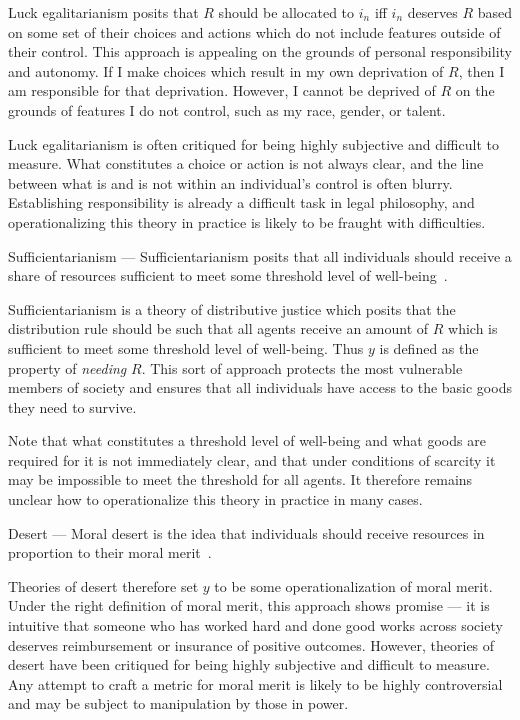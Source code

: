 Luck egalitarianism posits that $R$ should be allocated to $i_n$ iff $i_n$
deserves $R$ based on some set of their choices and actions which do not include
features outside of their control. This approach is appealing on the grounds of
personal responsibility and autonomy. If I make choices which result in my own
deprivation of $R$, then I am responsible for that deprivation. However, I
cannot be deprived of $R$ on the grounds of features I do not control, such as
my race, gender, or talent.

Luck egalitarianism is often critiqued for being highly subjective and difficult
to measure. What constitutes a choice or action is not always clear, and the
line between what is and is not within an individual's control is often blurry.
Establishing responsibility is already a difficult task in legal philosophy, and
operationalizing this theory in practice is likely to be fraught with
difficulties.

\begin{definition}
    Sufficientarianism — Sufficientarianism posits that all individuals should
    receive a share of resources sufficient to meet some threshold level of
    well-being~\cite{Sen_1979}.
\end{definition}

Sufficientarianism is a theory of distributive justice which posits that the
distribution rule should be such that all agents receive an amount of $R$ which
is sufficient to meet some threshold level of well-being. Thus $y$ is defined as
the property of \textit{needing} $R$. This sort of approach protects the most
vulnerable members of society and ensures that all individuals have access to
the basic goods they need to survive.

Note that what constitutes a threshold level of well-being and what goods are
required for it is not immediately clear, and that under conditions of scarcity
it may be impossible to meet the threshold for all agents. It therefore remains
unclear how to operationalize this theory in practice in many cases.

\begin{definition}
    Desert — Moral desert is the idea that individuals should receive resources
    in proportion to their moral merit~\cite{Pojman_1997}.
\end{definition}

Theories of desert therefore set $y$ to be some operationalization of moral
merit. Under the right definition of moral merit, this approach shows promise — 
it is intuitive that someone who has worked hard and done good works across
society deserves reimbursement or insurance of positive outcomes. However,
theories of desert have been critiqued for being highly subjective and difficult
to measure. Any attempt to craft a metric for moral merit is likely to be highly
controversial and may be subject to manipulation by those in power. 

